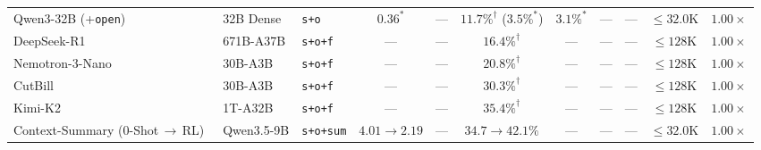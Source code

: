 \documentclass{article}
\newcommand{\rowstrut}{\rule[-1.60ex]{0pt}{4.25ex}}
\begin{document}
\begin{table}[!t]
{\begin{tabular}{lllcccccccc}
\rowstrut\textcolor{refmute}{Qwen3-32B (+\texttt{open})~\citep{chen2025browsecompplus}} & \textcolor{refmute}{32B Dense} & \textcolor{refmute}{\texttt{s+o}} & \textcolor{refmute}{$0.36^*$} & \textcolor{refmute}{---} & \textcolor{refmute}{$11.7\%^\dagger$ {\scriptsize($3.5\%^*$)}} & \textcolor{refmute}{$3.1\%^*$} & \textcolor{refmute}{---} & \textcolor{refmute}{---} & \textcolor{refmute}{$\le 32.0\text{K}$} & \textcolor{refmute}{$1.00\times$} \\
\rowstrut\textcolor{refmute}{DeepSeek-R1~\citep{deepseek2025r1,li2026openresearcher}} & \textcolor{refmute}{671B-A37B} & \textcolor{refmute}{\texttt{s+o+f}} & \textcolor{refmute}{---} & \textcolor{refmute}{---} & \textcolor{refmute}{$16.4\%^\dagger$} & \textcolor{refmute}{---} & \textcolor{refmute}{---} & \textcolor{refmute}{---} & \textcolor{refmute}{$\le 128\text{K}$} & \textcolor{refmute}{$1.00\times$} \\
\rowstrut\textcolor{refmute}{Nemotron-3-Nano~\citep{li2026openresearcher}} & \textcolor{refmute}{30B-A3B} & \textcolor{refmute}{\texttt{s+o+f}} & \textcolor{refmute}{---} & \textcolor{refmute}{---} & \textcolor{refmute}{$20.8\%^\dagger$} & \textcolor{refmute}{---} & \textcolor{refmute}{---} & \textcolor{refmute}{---} & \textcolor{refmute}{$\le 128\text{K}$} & \textcolor{refmute}{$1.00\times$} \\
\rowstrut\textcolor{refmute}{CutBill~\citep{li2026openresearcher}} & \textcolor{refmute}{30B-A3B} & \textcolor{refmute}{\texttt{s+o+f}} & \textcolor{refmute}{---} & \textcolor{refmute}{---} & \textcolor{refmute}{$30.3\%^\dagger$} & \textcolor{refmute}{---} & \textcolor{refmute}{---} & \textcolor{refmute}{---} & \textcolor{refmute}{$\le 128\text{K}$} & \textcolor{refmute}{$1.00\times$} \\
\rowstrut\textcolor{refmute}{Kimi-K2~\citep{li2026openresearcher}} & \textcolor{refmute}{1T-A32B} & \textcolor{refmute}{\texttt{s+o+f}} & \textcolor{refmute}{---} & \textcolor{refmute}{---} & \textcolor{refmute}{$35.4\%^\dagger$} & \textcolor{refmute}{---} & \textcolor{refmute}{---} & \textcolor{refmute}{---} & \textcolor{refmute}{$\le 128\text{K}$} & \textcolor{refmute}{$1.00\times$} \\
\rowstrut\textcolor{refmute}{Context-Summary (0-Shot\,$\to$\,RL)~\citep{shao2026clm}} & \textcolor{refmute}{Qwen3.5-9B} & \textcolor{refmute}{\texttt{s+o+sum}} & \textcolor{refmute}{$4.01{\to}2.19$} & \textcolor{refmute}{---} & \textcolor{refmute}{$34.7{\to}42.1\%$} & \textcolor{refmute}{---} & \textcolor{refmute}{---} & \textcolor{refmute}{---} & \textcolor{refmute}{$\le 32.0\text{K}$} & \textcolor{refmute}{$1.00\times$} \\

\end{tabular}}
\end{table}
\end{document}
